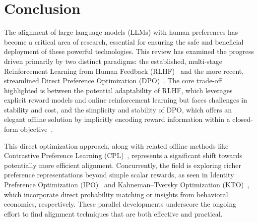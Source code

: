 \documentclass[a4paper,oneside,10pt,ngerman,english]{scrartcl}
\begin{document}
\section{Conclusion}
\label{sec:conclusion}

The alignment of large language models (LLMs) with human preferences has become a critical area of research, essential for ensuring the safe and beneficial deployment of these powerful technologies. This review has examined the progress driven primarily by two distinct paradigms: the established, multi-stage Reinforcement Learning from Human Feedback (RLHF)~\cite{bib:christiano2017deep} and the more recent, streamlined Direct Preference Optimization (DPO)~\cite{bib:rafailov2023direct}. The core trade-off highlighted is between the potential adaptability of RLHF, which leverages explicit reward models and online reinforcement learning but faces challenges in stability and cost, and the simplicity and stability of DPO, which offers an elegant offline solution by implicitly encoding reward information within a closed-form objective~\cite{bib:rafailov2023direct}.

This direct optimization approach, along with related offline methods like Contrastive Preference Learning (CPL)~\cite{bib:zhao2023contrastive}, represents a significant shift towards potentially more efficient alignment. Concurrently, the field is exploring richer preference representations beyond simple scalar rewards, as seen in Identity Preference Optimization (IPO)~\cite{bib:azar2023ipo} and Kahneman--Tversky Optimization (KTO)~\cite{bib:ethayarajh2024kto}, which incorporate direct probability matching or insights from behavioral economics, respectively. These parallel developments underscore the ongoing effort to find alignment techniques that are both effective and practical.
\end{document}
